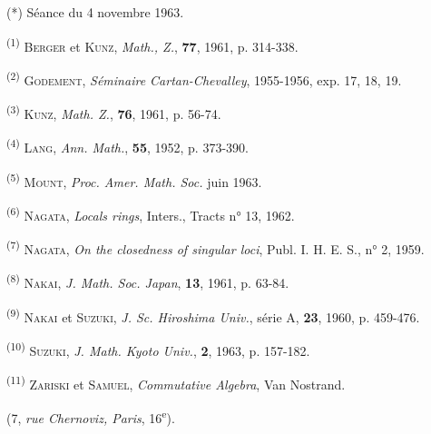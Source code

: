 (*) Séance du 4 novembre 1963.

\textsuperscript{(1)} \textsc{Berger} et \textsc{Kunz}, \textit{Math., Z.}, \textbf{77}, 1961, p. 314-338.

\textsuperscript{(2)} \textsc{Godement}, \textit{Séminaire Cartan-Chevalley}, 1955-1956, exp. 17, 18, 19.

\textsuperscript{(3)} \textsc{Kunz}, \textit{Math. Z.}, \textbf{76}, 1961, p. 56-74.

\textsuperscript{(4)} \textsc{Lang}, \textit{Ann. Math.}, \textbf{55}, 1952, p. 373-390.

\textsuperscript{(5)} \textsc{Mount}, \textit{Proc. Amer. Math. Soc.} juin 1963.

\textsuperscript{(6)} \textsc{Nagata}, \textit{Locals rings}, Inters., Tracts n° 13, 1962.

\textsuperscript{(7)} \textsc{Nagata}, \textit{On the closedness of singular loci}, Publ. I. H. E. S., n° 2, 1959.

\textsuperscript{(8)} \textsc{Nakai}, \textit{J. Math. Soc. Japan}, \textbf{13}, 1961, p. 63-84.

\textsuperscript{(9)} \textsc{Nakai} et \textsc{Suzuki}, \textit{J. Sc. Hiroshima Univ.}, série A, \textbf{23}, 1960, p. 459-476.

\textsuperscript{(10)} \textsc{Suzuki}, \textit{J. Math. Kyoto Univ.}, \textbf{2}, 1963, p. 157-182.

\textsuperscript{(11)} \textsc{Zariski} et \textsc{Samuel}, \textit{Commutative Algebra}, Van Nostrand.

\hfill (7, \textit{rue Chernoviz, Paris}, 16\textsuperscript{e}).

